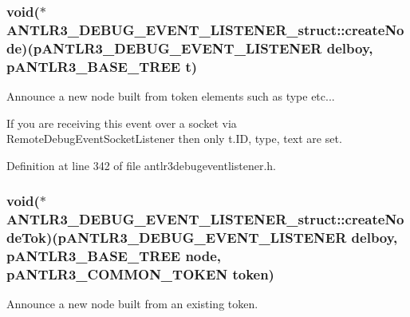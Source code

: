 \hypertarget{struct_a_n_t_l_r3___d_e_b_u_g___e_v_e_n_t___l_i_s_t_e_n_e_r__struct_ada0ce98f7c626520cc8ea71b2a371482}{
\subsubsection[{create\-Node}]{\setlength{\rightskip}{0pt plus 5cm}void($\ast$ A\-N\-T\-L\-R3\-\_\-\-D\-E\-B\-U\-G\-\_\-\-E\-V\-E\-N\-T\-\_\-\-L\-I\-S\-T\-E\-N\-E\-R\-\_\-struct\-::create\-Node)({\bf p\-A\-N\-T\-L\-R3\-\_\-\-D\-E\-B\-U\-G\-\_\-\-E\-V\-E\-N\-T\-\_\-\-L\-I\-S\-T\-E\-N\-E\-R} delboy, {\bf p\-A\-N\-T\-L\-R3\-\_\-\-B\-A\-S\-E\-\_\-\-T\-R\-E\-E} {\bf t})}}\label{struct_a_n_t_l_r3___d_e_b_u_g___e_v_e_n_t___l_i_s_t_e_n_e_r__struct_ada0ce98f7c626520cc8ea71b2a371482}
Announce a new node built from token elements such as type etc...

If you are receiving this event over a socket via Remote\-Debug\-Event\-Socket\-Listener then only t.\-I\-D, type, text are set. 

Definition at line 342 of file antlr3debugeventlistener.\-h.

\hypertarget{struct_a_n_t_l_r3___d_e_b_u_g___e_v_e_n_t___l_i_s_t_e_n_e_r__struct_ae524748e0a12e1c82a88892dabb8c1d6}{
\subsubsection[{create\-Node\-Tok}]{\setlength{\rightskip}{0pt plus 5cm}void($\ast$ A\-N\-T\-L\-R3\-\_\-\-D\-E\-B\-U\-G\-\_\-\-E\-V\-E\-N\-T\-\_\-\-L\-I\-S\-T\-E\-N\-E\-R\-\_\-struct\-::create\-Node\-Tok)({\bf p\-A\-N\-T\-L\-R3\-\_\-\-D\-E\-B\-U\-G\-\_\-\-E\-V\-E\-N\-T\-\_\-\-L\-I\-S\-T\-E\-N\-E\-R} delboy, {\bf p\-A\-N\-T\-L\-R3\-\_\-\-B\-A\-S\-E\-\_\-\-T\-R\-E\-E} {\bf node}, {\bf p\-A\-N\-T\-L\-R3\-\_\-\-C\-O\-M\-M\-O\-N\-\_\-\-T\-O\-K\-E\-N} token)}}\label{struct_a_n_t_l_r3___d_e_b_u_g___e_v_e_n_t___l_i_s_t_e_n_e_r__struct_ae524748e0a12e1c82a88892dabb8c1d6}
Announce a new node built from an existing token.

